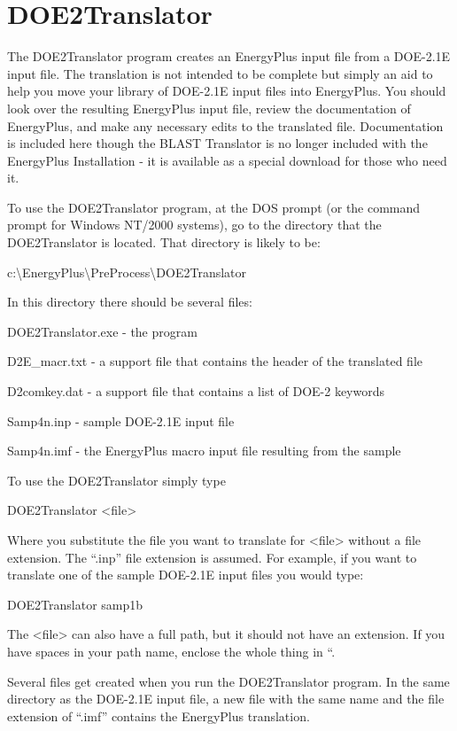 \chapter{DOE2Translator}\label{doe2translator}

The DOE2Translator program creates an EnergyPlus input file from a DOE-2.1E input file. The translation is not intended to be complete but simply an aid to help you move your library of DOE-2.1E input files into EnergyPlus. You should look over the resulting EnergyPlus input file, review the documentation of EnergyPlus, and make any necessary edits to the translated file. Documentation is included here though the BLAST Translator is no longer included with the EnergyPlus Installation - it is available as a special download for those who need it.

To use the DOE2Translator program, at the DOS prompt (or the command prompt for Windows NT/2000 systems), go to the directory that the DOE2Translator is located. That directory is likely to be:

c:\textbackslash{}EnergyPlus\textbackslash{}PreProcess\textbackslash{}DOE2Translator

In this directory there should be several files:

DOE2Translator.exe - the program

D2E\_macr.txt - a support file that contains the header of the translated file

D2comkey.dat - a support file that contains a list of DOE-2 keywords

Samp4n.inp - sample DOE-2.1E input file

Samp4n.imf - the EnergyPlus macro input file resulting from the sample

To use the DOE2Translator simply type

DOE2Translator \textless{}file\textgreater{}

Where you substitute the file you want to translate for \textless{}file\textgreater{} without a file extension. The ``.inp'' file extension is assumed. For example, if you want to translate one of the sample DOE-2.1E input files you would type:

DOE2Translator samp1b

The \textless{}file\textgreater{} can also have a full path, but it should not have an extension. If you have spaces in your path name, enclose the whole thing in ``.

Several files get created when you run the DOE2Translator program. In the same directory as the DOE-2.1E input file, a new file with the same name and the file extension of ``.imf'' contains the EnergyPlus translation.

